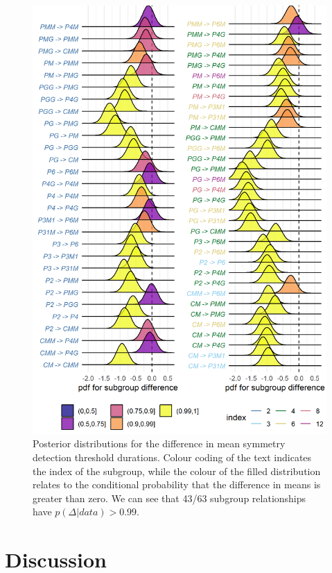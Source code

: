 \documentclass[11pt, twoside]{article}
\begin{document}
\begin{figure}[hptb]
\centering
\includegraphics[width=0.75\linewidth]{../analysis/plots/subgroup_comp_psychophysical.png}
\caption{Posterior distributions for the difference in mean symmetry detection threshold durations. Colour coding of the text indicates the index of the subgroup, while the colour of the filled distribution relates to the conditional probability that the difference in means is greater than zero. We can see that 43/63 subgroup relationships have $p(\Delta|data)>0.99$.}
\label{fig:durations_comp}
\end{figure}

\section*{Discussion}
\end{document}
